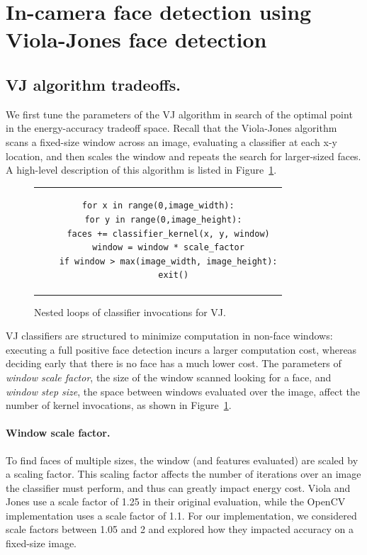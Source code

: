 \section{In-camera face detection using Viola-Jones face detection}

\subsection{VJ algorithm tradeoffs.}
We first tune the parameters of the VJ algorithm in search of the optimal point in the energy-accuracy tradeoff space.
Recall that the Viola-Jones algorithm scans a fixed-size window across an image,
evaluating a classifier at each x-y location, and then scales the window and repeats
the search for larger-sized faces.
A high-level description of this algorithm is listed in Figure~\ref{fig:vj-algo}.

\begin{figure}
\begin{tabular}{c}  %
\begin{lstlisting}
for x in range(0,image_width):
  for y in range(0,image_height):
    faces += classifier_kernel(x, y, window)
    window = window * scale_factor
    if window > max(image_width, image_height):
      exit()
\end{lstlisting}
\end{tabular}
\caption{Nested loops of classifier invocations for VJ.}
\label{fig:vj-algo}
\end{figure}


VJ classifiers are structured to minimize computation in non-face windows: executing a full positive face detection incurs a larger computation cost, whereas deciding early that there is no face has a much lower cost.
The parameters of \textit{window scale factor}, the size of the window scanned looking for a face, and \textit{window step size}, the space between windows evaluated over the image, affect the number of kernel invocations, as shown in Figure~\ref{fig:vj-algo}.

\paragraph{Window scale factor.}
To find faces of
multiple sizes, the window (and features evaluated) are scaled by a scaling factor. This scaling factor
affects the number of iterations over an image the classifier must perform, and thus can greatly impact
energy cost. Viola and Jones use a scale factor of 1.25 in their original evaluation, while the OpenCV
implementation uses a scale factor of 1.1. For our implementation, we considered scale factors between 1.05
and 2 and explored how they impacted accuracy on a fixed-size image.

